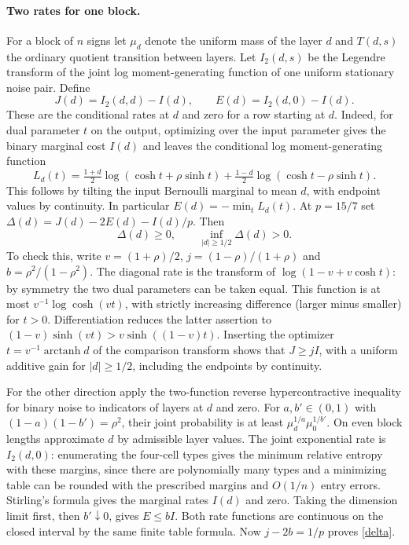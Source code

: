 \paragraph{Two rates for one block.}
For a block of $n$ signs let $\mu_d$ denote the uniform mass of the layer $d$ and $T(d,s)$ the ordinary quotient transition between layers. Let $I_2(d,s)$ be the Legendre transform of the joint log moment-generating function of one uniform stationary noise pair. Define
\[
 J(d)=I_2(d,d)-I(d),\qquad E(d)=I_2(d,0)-I(d).
\]
These are the conditional rates at $d$ and zero for a row starting at $d$. Indeed, for dual parameter $t$ on the output, optimizing over the input parameter gives the binary marginal cost $I(d)$ and leaves the conditional log moment-generating function
\[
 L_d(t)=\tfrac{1+d}{2}\log(\cosh t+\rho\sinh t)
       +\tfrac{1-d}{2}\log(\cosh t-\rho\sinh t).
\]
This follows by tilting the input Bernoulli marginal to mean $d$, with endpoint values by continuity. In particular $E(d)=-\min_t L_d(t)$.
At $p=15/7$ set $\Delta(d)=J(d)-2E(d)-I(d)/p$. Then
\begin{equation}\label{delta}
 \Delta(d)\ge0,\qquad \inf_{|d|\ge1/2}\Delta(d)>0.
\end{equation}
To check this, write $v=(1+\rho)/2$, $j=(1-\rho)/(1+\rho)$ and $b=\rho^2/(1-\rho^2)$. The diagonal rate is the transform of $\log(1-v+v\cosh t)$: by symmetry the two dual parameters can be taken equal. This function is at most $v^{-1}\log\cosh(vt)$, with strictly increasing difference (larger minus smaller) for $t>0$. Differentiation reduces the latter assertion to $(1-v)\sinh(vt)>v\sinh((1-v)t)$. Inserting the optimizer $t=v^{-1}\operatorname{arctanh}d$ of the comparison transform shows that $J\ge jI$, with a uniform additive gain for $|d|\ge1/2$, including the endpoints by continuity.

For the other direction apply the two-function reverse hypercontractive inequality for binary noise \cite{mos} to indicators of layers at $d$ and zero. For $a,b'\in(0,1)$ with $(1-a)(1-b')=\rho^2$, their joint probability is at least $\mu_d^{1/a}\mu_0^{1/b'}$. On even block lengths approximate $d$ by admissible layer values. The joint exponential rate is $I_2(d,0)$: enumerating the four-cell types gives the minimum relative entropy with these margins, since there are polynomially many types and a minimizing table can be rounded with the prescribed margins and $O(1/n)$ entry errors. Stirling's formula gives the marginal rates $I(d)$ and zero. Taking the dimension limit first, then $b'\downarrow0$, gives $E\le bI$. Both rate functions are continuous on the closed interval by the same finite table formula. Now $j-2b=1/p$ proves \eqref{delta}.

